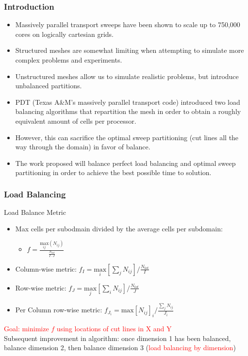 \documentclass[xcolor={usenames,dvipsnames,svgnames,table}]{beamer}
\newcommand{\tcr}[1]{\textcolor{red}{#1}}
\begin{document}
\begin{frame}[t]\frametitle{Introduction}
\begin{block}{}
\begin{itemize}
	\item Massively parallel transport sweeps have been shown to scale up to 750,000 cores on logically cartesian grids.
	\item Structured meshes are somewhat limiting when attempting to simulate more complex problems and experiments.
	\item Unstructured meshes allow us to simulate realistic problems, but introduce unbalanced partitions. 
	\item PDT (Texas A\&M's massively parallel transport code) introduced two load balancing algorithms that repartition the mesh in order to obtain a roughly equivalent amount of cells per processor. 
	\item However, this can sacrifice the optimal sweep partitioning (cut lines all the way through the domain) in favor of balance. 
	\item The work proposed will balance perfect load balancing and optimal sweep partitioning in order to achieve the best possible time to solution.
\end{itemize}
\end{block}
\end{frame}

\begin{frame}[t]\frametitle{Load Balancing}
\begin{block}{Load Balance Metric}
  \begin{itemize}
    \item Max cells per subodmain divided by the average cells per subdomain:
      \begin{itemize}
        \item$f =\frac{\underset{ij}{\text{max}}(N_{ij})}{\frac{N_{tot}}{I\cdot J}}$
      \end{itemize}
    \item Column-wise metric: $f_I = \underset{i}{\text{max}}[\sum_{j} N_{ij}]/\frac{N_{tot}}{I}$
    \item Row-wise metric: $f_J = \underset{j}{\text{max}}[\sum_{i} N_{ij}]/\frac{N_{tot}}{J}$
    \item Per Column row-wise metric: $f_{J_i} = \text{max}[N_{ij}]_i/\frac{\sum_{j}N_{ij}}{J_i}$
  \end{itemize}		
  \tcr{Goal: minimize $f$ using locations of cut lines in X and Y}\\
    
  Subsequent improvement in algorithm: once dimension 1 has been balanced, balance dimension 2, then balance dimension 3 (\tcr{load balancing by dimension})
\end{block}
\end{frame}
\end{document}
